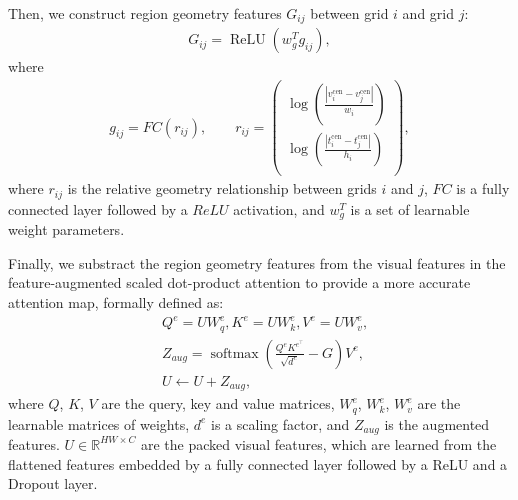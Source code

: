\documentclass[letterpaper]{article} %
\begin{document}
	Then, we construct region geometry features $G_{i j}$ between grid $i$ and grid $j$:
	\begin{gather}
	\label{eq:geometry-repre}
	G_{i j}=\operatorname{ReLU}\left(w_{g}^{T} g_{i j}\right),
	\end{gather}
	where
	\begin{gather}
	g_{i j}=F C\left(r_{i j}\right), \qquad r_{i j}=\left(\begin{array}{c}
	\log \left(\frac{\left|v^{\text{cen}}_{i}-v^{\text{cen}}_{j}\right|}{w_{i}}\right) \\
	\log \left(\frac{\left|t^{\text{cen}}_{i}-t^{\text{cen}}_{j}\right|}{h_{i}}\right) \\
	\end{array}\right),
	\end{gather}
	where $r_{ij}$ is the relative geometry relationship between grids $i$ and $j$, $FC$ is a fully connected layer followed by a $ReLU$ activation, and $w_{g}^{T}$ is a set of learnable weight parameters.
	
	Finally, we substract the region geometry features from the visual features in the feature-augmented scaled dot-product attention to provide a more accurate attention map, formally defined as: 
	\begin{align}
	\label{eq:encoder-atten}
	&Q^e=U W_{q}^e, K^e=U W_{k}^e, V^e=U W_{v}^e, \\
	&Z_{a u g}=\operatorname{softmax}\left(\frac{Q^e K^{e^{\top}}}{\sqrt{d^e}}-G\right) V^e,\\
	&U \leftarrow U+Z_{aug},
	\end{align}
	where $Q$, $K$, $V$ are the query, key and value matrices, $W_q^e$, $W_k^e$, $W_v^e$ are the learnable matrices of weights, $d^e$ is a scaling factor, and $Z_{aug}$ is the augmented features. $U\in \mathbb{R}^{HW \times C}$ are the packed visual features, which are learned from the flattened features embedded by a fully connected layer followed by a ReLU and a Dropout layer. 
	
\end{document}
